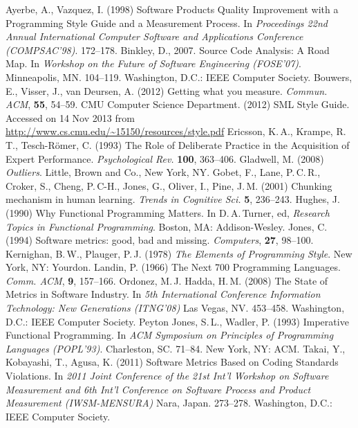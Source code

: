 \documentclass[12pt,abstracton]{scrartcl}
\begin{document}
\begin{thebibliography}{99}
 Ayerbe, A., Vazquez, I. (1998) Software Products Quality Improvement with a Programming Style Guide and a Measurement Process. In \emph{Proceedings 22nd Annual International Computer Software and Applications Conference (COMPSAC'98)}. 172--178.
 Binkley, D., 2007. Source Code Analysis: A Road Map. In \emph{Workshop on the Future of Software Engineering (FOSE'07)}. Minneapolis, MN. 104--119. Washington, D.C.: IEEE Computer Society.
 Bouwers, E., Visser, J., van Deursen, A. (2012) Getting what you measure. \emph{Commun. ACM}, \textbf{55}, 54--59.
 CMU Computer Science Department. (2012) SML Style Guide. Accessed on 14 Nov 2013 from \url{http://www.cs.cmu.edu/~15150/resources/style.pdf}
 Ericsson, K.\,A., Krampe, R.\,T., Tesch-R\"{o}mer, C. (1993) The Role of Deliberate Practice in the Acquisition of Expert Performance. \emph{Psychological Rev.} \textbf{100}, 363--406.
 Gladwell, M. (2008) \emph{Outliers}. Little, Brown and Co., New York, NY.
 Gobet, F., Lane, P.\,C.\,R., Croker, S., Cheng, P.\,C-H., Jones, G., Oliver, I., Pine, J.\,M. (2001) Chunking mechanism in human learning. \emph{Trends in Cognitive Sci.} \textbf{5}, 236--243.
 Hughes, J. (1990) Why Functional Programming Matters. In D.\,A.\,Turner, ed, \emph{Research Topics in Functional Programming}. Boston, MA: Addison-Wesley.
 Jones, C. (1994) Software metrics: good, bad and missing. \emph{Computers}, \textbf{27}, 98--100.
 Kernighan, B.\,W., Plauger, P.\,J. (1978) \emph{The Elements of Programming Style}. New York, NY: Yourdon.
 Landin, P. (1966) The Next 700 Programming Languages. \emph{Comm. ACM}, \textbf{9}, 157--166.
 Ordonez, M.\,J. Hadda, H.\,M. (2008) The State of Metrics in Software Industry. In \emph{5th International Conference Information Technology: New Generations (ITNG'08)} Las Vegas, NV. 453--458. Washington, D.C.: IEEE Computer Society.
 Peyton Jones, S.\,L., Wadler, P. (1993) Imperative Functional Programming. In \emph{ACM Symposium on Principles of Programming Languages (POPL'93)}. Charleston, SC. 71--84. New York, NY: ACM.
 Takai, Y., Kobayashi, T., Agusa, K. (2011) Software Metrics Based on Coding Standards Violations. In \emph{2011 Joint Conference of the 21st Int'l Workshop on Software Measurement and 6th Int'l Conference on Software Process and Product Measurement (IWSM-MENSURA)} Nara, Japan. 273--278. Washington, D.C.: IEEE Computer Society.

\end{thebibliography}
\end{document}
